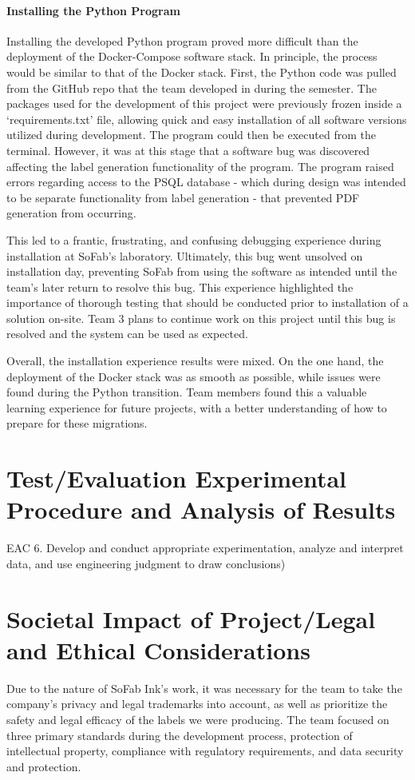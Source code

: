 \documentclass{article}
\begin{document}
\paragraph{Installing the Python Program} Installing the developed Python program proved more difficult than the deployment of the 
Docker-Compose software stack. In principle, the process would be similar to that of the Docker stack. First, the Python code was pulled 
from the GitHub repo that the team developed in during the semester. The packages used for the development of this project were 
previously frozen inside a `requirements.txt' file, allowing quick and easy installation of all software versions utilized during 
development. The program could then be executed from the terminal. However, it was at this stage that a software bug was discovered
affecting the label generation functionality of the program. The program raised errors regarding access to the PSQL database - which 
during design was intended to be separate functionality from label generation - that prevented PDF generation from occurring.

This led to a frantic, frustrating, and confusing debugging experience during installation at SoFab's laboratory. Ultimately, this 
bug went unsolved on installation day, preventing SoFab from using the software as intended until the team's later return to resolve 
this bug. This experience highlighted the importance of thorough testing that should be conducted prior to installation of a 
solution on-site. Team 3 plans to continue work on this project until this bug is resolved and the system can be used as expected.

Overall, the installation experience results were mixed. On the one hand, the deployment of the Docker stack was as smooth as possible, 
while issues were found during the Python transition. Team members found this a valuable learning experience for future projects, 
with a better understanding of how to prepare for these migrations.

\section{Test/Evaluation Experimental Procedure and Analysis of Results} 
EAC 6. Develop and conduct appropriate experimentation, analyze and interpret 
data, and use engineering judgment to draw conclusions) 

\section{Societal Impact of Project\slash Legal and Ethical Considerations} 
Due to the nature of SoFab Ink’s work, it was necessary for the team to take the company’s privacy and legal trademarks into account, as 
well as prioritize the safety and legal efficacy of the labels we were producing. The team focused on three primary standards during 
the development process, protection of intellectual property, compliance with regulatory requirements, and data security 
and protection. 
\end{document}
